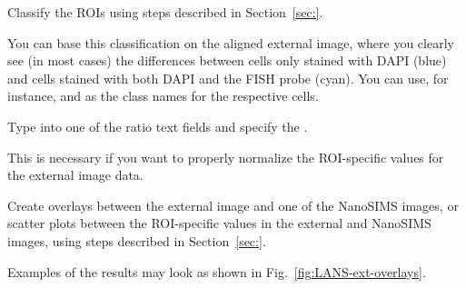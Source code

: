 \s Classify the ROIs using steps described in Section~\ref{sec:}.

\nb\bul
You can base this classification on the aligned external image, where you clearly see (in most cases) the differences between cells only stained with DAPI (blue) and cells stained with both DAPI and the FISH probe (cyan). You can use, for instance,  and  as the class names for the respective cells.

\s Type  into one of the ratio  text fields and specify the .

\nb\bul This is necessary if you want to properly normalize the ROI-specific values for the external image data.

\s Create overlays between the external image and one of the NanoSIMS images, or scatter plots between the ROI-specific values in the external and NanoSIMS images, using steps described in Section~\ref{sec:}. 

\nb\bul Examples of the results may look as shown in Fig.~\ref{fig:LANS-ext-overlays}.

